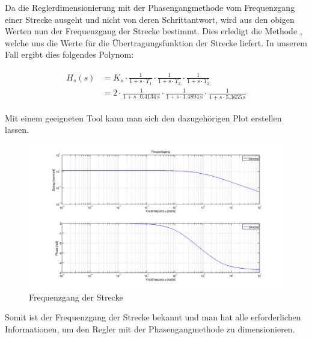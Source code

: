 Da  die  Reglerdimensionierung  mit  der  Phasengangmethode  vom  Frequenzgang
einer  Strecke  ausgeht und  nicht  von  deren  Schrittantwort, wird  aus  den
obigen  Werten  nun der  Frequenzgang  der  Strecke bestimmt.   Dies  erledigt
die  Methode \footnotemark[3],  welche uns  die Werte  f\"ur die
\"Ubertragungsfunktion  der  Strecke liefert.   In  unserem  Fall ergibt  dies
folgendes Polynom:


\begin{gather} \label{eq:transfer:plant}
    \begin{split}
        H_s (s) & = K_s
                  \cdot \frac{1}{1 + s \cdot T_1}
                  \cdot \frac{1}{1 + s \cdot T_2}
                  \cdot \frac{1}{1 + s \cdot T_2}                     \\
                & = 2
                  \cdot \frac{1}{1 + s \cdot \SI{0.4134}{\second}}
                  \cdot \frac{1}{1 + s \cdot \SI{1.4894}{\second}}
                  \cdot \frac{1}{1 + s \cdot \SI{5.3655}{\second}}
    \end{split}
\end{gather}

Mit einem  geeigneten Tool  kann man sich  den dazugeh\"origen  Plot erstellen
lassen.

\begin{figure}[h! width=\pagewidth]
    \includegraphics[width=\textwidth]{images/streckeFrequenzgang.png}
    \caption{%
        Frequenzgang der Strecke%
    }
    \label{fig:plant_freq}
\end{figure}

Somit ist der Frequenzgang der Strecke bekannt und man hat alle erforderlichen
Informationen, um den Regler mit der Phasengangmethode zu dimensionieren.
